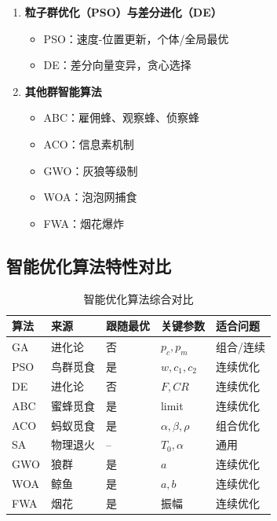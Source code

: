 \begin{conceptbox}
\begin{enumerate}[label=\arabic*., leftmargin=2em]
\begin{itemize}
    \end{itemize}
    \item \textbf{粒子群优化（PSO）与差分进化（DE）}
    \begin{itemize}
        \item PSO：速度-位置更新，个体/全局最优
        \item DE：差分向量变异，贪心选择
    \end{itemize}
    \item \textbf{其他群智能算法}
    \begin{itemize}
        \item ABC：雇佣蜂、观察蜂、侦察蜂
        \item ACO：信息素机制
        \item GWO：灰狼等级制
        \item WOA：泡泡网捕食
        \item FWA：烟花爆炸
    \end{itemize}
\end{enumerate}
\end{conceptbox}

\subsection{智能优化算法特性对比}

\begin{table}[htbp]
\centering
\caption{智能优化算法综合对比}
\begin{tabular}{@{}lllll@{}}
\toprule
\textbf{算法} & \textbf{来源} & \textbf{跟随最优} & \textbf{关键参数} & \textbf{适合问题} \\
\midrule
GA & 进化论 & 否 & $p_c, p_m$ & 组合/连续 \\
PSO & 鸟群觅食 & 是 & $w, c_1, c_2$ & 连续优化 \\
DE & 进化论 & 否 & $F, CR$ & 连续优化 \\
ABC & 蜜蜂觅食 & 是 & limit & 连续优化 \\
ACO & 蚂蚁觅食 & 是 & $\alpha, \beta, \rho$ & 组合优化 \\
SA & 物理退火 & -- & $T_0, \alpha$ & 通用 \\
GWO & 狼群 & 是 & $a$ & 连续优化 \\
WOA & 鲸鱼 & 是 & $a, b$ & 连续优化 \\
FWA & 烟花 & 是 & 振幅 & 连续优化 \\
\bottomrule
\end{tabular}
\end{table}


